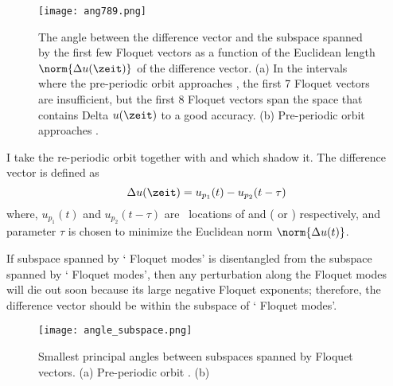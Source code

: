 \begin{figure}[h]
  \centering
  \texttt{[image: ang789.png]}
  \caption{The angle between the difference vector
   and the subspace spanned by the first few
  Floquet vectors as a function of the Euclidean length $\norm{\Delta
  u(\zeit)}$ of the difference vector. (a) In the intervals where the
  pre-periodic orbit  approaches , the first 7
  Floquet vectors are insufficient, but the first 8 Floquet vectors
  span the space that contains Delta $u(\zeit)$ to a good accuracy. (b)
  Pre-periodic orbit  approaches .
  }
  \label{fig:ang789}
\end{figure}

I take the re-periodic orbit  together with  and 
which shadow it. The difference vector is defined
as
\begin{equation}
  \label{eq:differencevector}
  \Delta u(\zeit)=u_{p_1}(t)-u_{p_2}(t-\tau)
\end{equation}
where, $u_{p_1}(t)$ and $u_{p_2}(t-\tau)$ are \statesp\ locations  of
  and ( or ) respectively, and
parameter $\tau$ is chosen to minimize the Euclidean norm $\norm{\Delta u(t)}$.

If subspace spanned by `{\transient} Floquet modes' is disentangled from the
subspace spanned by `{\entangled} Floquet modes', then any perturbation along
the {\transient} Floquet modes will die out soon because its large negative
Floquet exponents; therefore, the difference vector should be within the
subspace of `{\entangled} Floquet modes'.

\begin{figure}%
  \centering
  \texttt{[image: angle\_subspace.png]}
  \caption{
  Smallest principal angles between subspaces spanned by Floquet vectors.
  (a) Pre-periodic orbit . (b) \po\ 
  }
  \label{fig:angle_subspace}
\end{figure}

